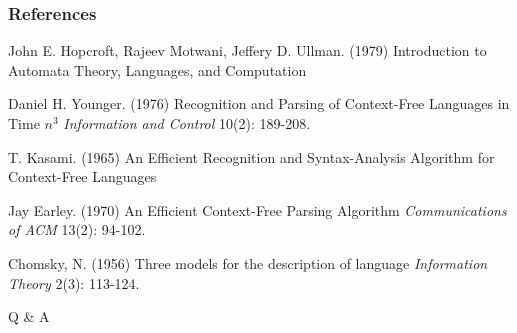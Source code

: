 \documentclass{beamer}
\begin{document}

\begin{frame}
\frametitle{References}
\footnotesize{
\begin{thebibliography}{99} %
 John E. Hopcroft, Rajeev Motwani, Jeffery D. Ullman. (1979)
\newblock Introduction to Automata Theory, Languages, and Computation

 Daniel H. Younger. (1976)
\newblock Recognition and Parsing of Context-Free Languages in Time $n^3$
\newblock \emph{Information and Control} 10(2): 189-208.

 T. Kasami. (1965)
\newblock An Efficient Recognition and Syntax-Analysis Algorithm for Context-Free Languages

 Jay Earley. (1970)
\newblock An Efficient Context-Free Parsing Algorithm
\newblock \emph{Communications of ACM} 13(2): 94-102.

 Chomsky, N. (1956)
\newblock Three models for the description of language
\newblock \emph{Information Theory} 2(3): 113-124.
\end{thebibliography}
}
\end{frame}


\begin{frame}
\Huge{\centerline{Q \& A}}
\end{frame}

\end{document}

